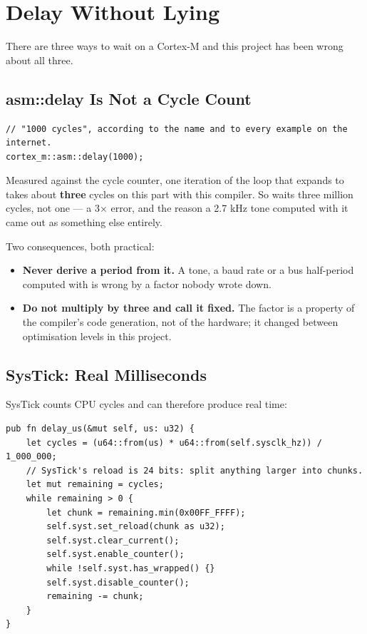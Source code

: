 \section{Delay Without Lying}
\label{sec:clocks-delay}

There are three ways to wait on a Cortex-M and this project has been wrong about all three.

\subsection{asm::delay Is Not a Cycle Count}

\begin{verbatim}
// "1000 cycles", according to the name and to every example on the internet.
cortex_m::asm::delay(1000);
\end{verbatim}

Measured against the cycle counter, one iteration of the loop that  expands
to takes about \textbf{three} cycles on this part with this compiler. So
 waits three million cycles, not one — a 3× error, and the reason a
2.7 kHz tone computed with it came out as something else entirely.

Two consequences, both practical:

\begin{itemize}
    \item \textbf{Never derive a period from it.} A tone, a baud rate or a bus half-period computed
          with  is wrong by a factor nobody wrote down.
    \item \textbf{Do not multiply by three and call it fixed.} The factor is a property of the
          compiler's code generation, not of the hardware; it changed between optimisation levels in
          this project.
\end{itemize}

\subsection{SysTick: Real Milliseconds}

SysTick counts CPU cycles and can therefore produce real time:

\begin{verbatim}
pub fn delay_us(&mut self, us: u32) {
    let cycles = (u64::from(us) * u64::from(self.sysclk_hz)) / 1_000_000;
    // SysTick's reload is 24 bits: split anything larger into chunks.
    let mut remaining = cycles;
    while remaining > 0 {
        let chunk = remaining.min(0x00FF_FFFF);
        self.syst.set_reload(chunk as u32);
        self.syst.clear_current();
        self.syst.enable_counter();
        while !self.syst.has_wrapped() {}
        self.syst.disable_counter();
        remaining -= chunk;
    }
}
\end{verbatim}

